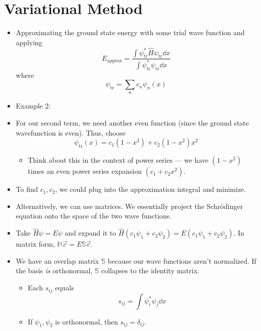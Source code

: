 \documentclass[../notes.tex]{subfiles}
\begin{document}
\section{Variational Method}
\begin{itemize}
    \item {}Approximating the ground state energy with some trial wave function and applying
    \begin{equation*}
        E_\text{approx} = \frac{\int\psi_\text{tr}^*\hat{H}\psi_\text{tr}\dd{x}}{\int\psi_\text{tr}^*\psi_\text{tr}\dd{x}}
    \end{equation*}
    where
    \begin{equation*}
        \psi_\text{tr} = \sum_nc_n\psi_n(x)
    \end{equation*}
    \item Example 2:
    \item For our second term, we need another even function (since the ground state wavefunction is even). Thus, choose
    \begin{equation*}
        \psi_\text{tr}(x) = c_1(1-x^2)+c_2(1-x^2)x^2
    \end{equation*}
    \begin{itemize}
        \item Think about this in the context of power series --- we have $(1-x^2)$ times an even power series expansion $(c_1+c_2x^2)$.
    \end{itemize}
    \item To find $c_1,c_2$, we could plug into the approximation integral and minimize.
    \item Alternatively, we can use matrices. We essentially project the Schr\"{o}dinger equation onto the space of the two wave functions.
    \item Take $\hat{H}\psi=E\psi$ and expand it to $\hat{H}(c_1\psi_1+c_2\psi_2)=E(c_1\psi_1+c_2\psi_2)$. In matrix form, $\mathbb{H}\vec{c}=E\mathbb{S}\vec{c}$.
    \item We have an overlap matrix $\mathbb{S}$ because our wave functions aren't normalized. If the basis \emph{is} orthonormal, $\mathbb{S}$ collapses to the identity matrix.
    \begin{itemize}
        \item Each $s_{ij}$ equals
        \begin{equation*}
            s_{ij} = \int\psi_i^*\psi_j\dd{x}
        \end{equation*}
        \item If $\psi_1,\psi_2$ is orthonormal, then $s_{ij}=\delta_{ij}$.

\end{itemize}
\end{itemize}
\end{document}

